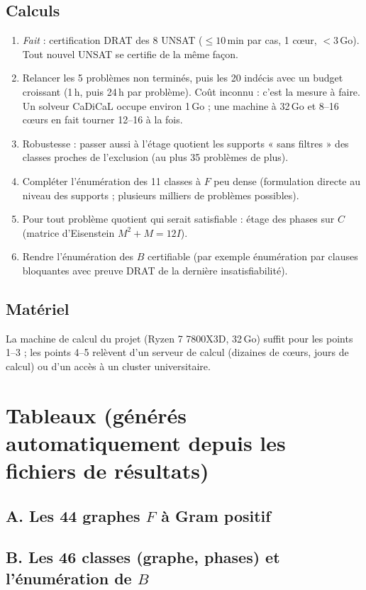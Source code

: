 \documentclass[11pt,a4paper]{article}
\theoremstyle{remark}
\begin{document}
\subsection*{Calculs}
\begin{enumerate}[nosep]
\item \emph{Fait} : certification DRAT des 8 UNSAT ($\le 10$\,min par cas, 1 cœur, $<3$\,Go). Tout nouvel UNSAT se certifie de la même façon.
\item Relancer les 5 problèmes non terminés, puis les 20 indécis avec un budget croissant (1\,h, puis 24\,h par problème). Coût inconnu : c'est la mesure
à faire. Un solveur CaDiCaL occupe environ 1\,Go ; une machine à 32\,Go et 8--16 cœurs en fait tourner 12--16 à la fois.
\item Robustesse : passer aussi à l'étage quotient les supports « sans filtres » des classes proches de l'exclusion (au plus 35 problèmes de plus).
\item Compléter l'énumération des 11 classes à $F$ peu dense (formulation directe au niveau des supports ; plusieurs milliers de problèmes possibles).
\item Pour tout problème quotient qui serait satisfiable : étage des phases sur $C$ (matrice d'Eisenstein $M^2+M=12I$).
\item Rendre l'énumération des $B$ certifiable (par exemple énumération par clauses bloquantes avec preuve DRAT de la dernière insatisfiabilité).
\end{enumerate}
\subsection*{Matériel}
La machine de calcul du projet (Ryzen 7 7800X3D, 32\,Go) suffit pour les points 1--3 ; les points 4--5 relèvent d'un serveur de calcul (dizaines de cœurs,
jours de calcul) ou d'un accès à un cluster universitaire.




\appendix
\section{Tableaux (générés automatiquement depuis les fichiers de résultats)}
\subsection*{A. Les 44 graphes $F$ à Gram positif}
{\small}
\subsection*{B. Les 46 classes (graphe, phases) et l'énumération de $B$}
{\small}
\end{document}

